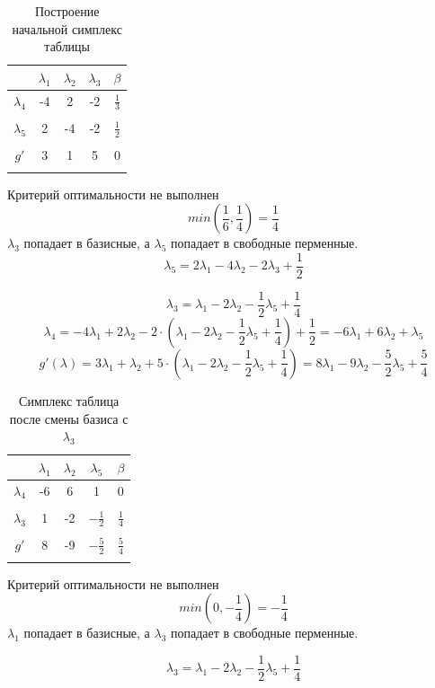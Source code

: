 \documentclass{article}
\begin{document}
\begin{table}[H]
    \centering
    \caption{Построение начальной симплекс таблицы}
    \begin{tabular}{|c|c|c|c|c|}
    \hline
    &$\lambda_1$&$\lambda_2$&$\lambda_3$&$\beta$\\\hline
    $\lambda_4$&-4&2&-2&$\frac{1}{3}$\\
    &&&&\\\hline
    $\lambda_5$&2&-4&-2&$\frac{1}{2}$\\
    &&&&\\\hline
    $g'$&3&1&5&0\\
    &&&&\\\hline
    \end{tabular}
\end{table}
Критерий оптимальности не выполнен 
\[min(\frac{1}{6}, \frac{1}{4}) = \frac{1}{4}\]
 $\lambda_3$ попадает в базисные, а $\lambda_5$ попадает в свободные перменные.
\[\lambda_5 = 2\lambda_1 -4\lambda_2-2\lambda_3 +\frac{1}{2}\]

\[\lambda_3 = \lambda_1 - 2 \lambda_2 - \frac{1}{2}\lambda_5 +\frac{1}{4} \]
\[\lambda_4 = -4\lambda_1 +2\lambda_2-2\cdot (\lambda_1 - 2 \lambda_2 - \frac{1}{2}\lambda_5 +\frac{1}{4}) + \frac{1}{2} = -6\lambda_1 +6\lambda_2+\lambda_5\]
\[g'(\lambda) = 3\lambda_1 + \lambda_2 + 5\cdot(\lambda_1 - 2 \lambda_2 - \frac{1}{2}\lambda_5 +\frac{1}{4}) =8\lambda_1 - 9\lambda_2-\frac{5}{2}\lambda_5+\frac{5}{4}\]

\begin{table}[H]
    \centering
    \caption{Симплекс таблица после смены базиса с $\lambda_3$}
    \begin{tabular}{|c|c|c|c|c|}
    \hline
    &$\lambda_1$&$\lambda_2$&$\lambda_5$&$\beta$\\\hline
    $\lambda_4$&-6&6&1&0\\
    &&&&\\\hline
    $\lambda_3$&1&-2&$-\frac{1}{2}$&$\frac{1}{4}$\\
    &&&&\\\hline
    $g'$&8&-9&$-\frac{5}{2}$&$\frac{5}{4}$\\
    &&&&\\\hline
    \end{tabular}
\end{table}
Критерий оптимальности не выполнен 
\[min(0, -\frac{1}{4}) = -\frac{1}{4}\]
$\lambda_1$ попадает в базисные, а $\lambda_3$ попадает в свободные перменные.

\[\lambda_3 = \lambda_1 - 2 \lambda_2 - \frac{1}{2}\lambda_5 +\frac{1}{4} \]
\end{document}
